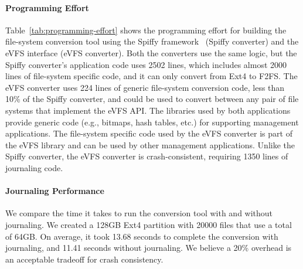 \vspace{-0.25em}
\paragraph{Programming Effort} Table~\ref{tab:programming-effort} shows the programming effort for building the file-system conversion tool using the Spiffy framework~\cite{sun2018spiffy} (Spiffy converter) and the eVFS interface (eVFS converter). Both the converters use the same logic, but the Spiffy converter's application code uses 2502 lines, which includes almost 2000 lines of file-system specific code, and it can only convert from Ext4 to F2FS. The eVFS converter uses 224 lines of generic file-system conversion code, less than 10\% of the Spiffy converter, and could be used to convert between any pair of file systems that implement the eVFS API. The libraries used by both applications provide generic code (e.g., bitmaps, hash tables, etc.) for supporting management applications. The file-system specific code used by the eVFS converter is part of the eVFS library and can be used by other management applications. Unlike the Spiffy converter, the eVFS converter is crash-consistent, requiring 1350 lines of journaling code.
  
\vspace{-0.25em}
\paragraph{Journaling Performance} We compare the time it takes to run the conversion tool with and without journaling. We created a 128GB Ext4 partition with 20000 files that use a total of 64GB. On average, it took 13.68 seconds to complete the conversion with journaling, and 11.41 seconds without journaling. We believe a 20\% overhead is an acceptable tradeoff for crash consistency.


